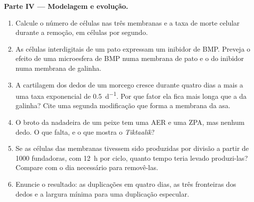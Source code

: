\begin{problem}
\medskip
\noindent\textbf{Parte IV --- Modelagem e evolução.}
\begin{enumerate}[resume]
  \item Calcule o número de células nas três membranas e a taxa de morte
        celular durante a remoção, em células por segundo.
  \item As células interdigitais de um pato expressam um inibidor de
        BMP. Preveja o efeito de uma microesfera de BMP numa membrana de
        pato e o do inibidor numa membrana de galinha.
  \item A cartilagem dos dedos de um morcego cresce durante quatro dias
        a mais a uma taxa exponencial de \qty{0.5}{d^{-1}}. Por que fator
        ela fica mais longa que a da galinha? Cite uma segunda
        modificação que forma a membrana da asa.
  \item O broto da nadadeira de um peixe tem uma AER e uma ZPA, mas
        nenhum dedo. O que falta, e o que mostra o \emph{Tiktaalik}?
  \item Se as células das membranas tivessem sido produzidas por
        divisão a partir de \num{1000} fundadoras, com \qty{12}{h} por
        ciclo, quanto tempo teria levado produzi-las? Compare com o dia
        necessário para removê-las.
  \item Enuncie o resultado: as duplicações em quatro dias, as três
        fronteiras dos dedos e a largura mínima para uma duplicação
        especular.
\end{enumerate}
\end{problem}
